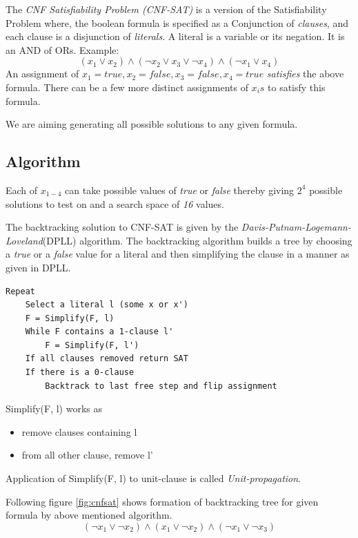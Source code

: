 \documentclass[a4paper]{article}
\begin{document}
The \emph{CNF Satisfiability Problem (CNF-SAT)} is a version of the Satisfiability Problem where, the boolean formula is specified as a Conjunction of \emph{clauses}, and each clause is a disjunction of \emph{literals}. A literal is a variable or its negation. It is an AND of ORs. Example: $$(x_{1} \lor x_{2})\land(\neg x_{2} \lor x_{3} \lor \neg x_{4})\land(\neg x_{1} \lor x_{4})$$
An assignment of $x_{1} = true, x_{2} = false, x_{3} = false, x_{4} = true$ \emph{satisfies} the above formula. There can be a few more distinct assignments of $x_{i}s$ to satisfy this formula.

We are aiming generating all possible solutions to any given formula.
\subsection*{Algorithm}
Each of $x_{1-4}$ can take possible values of \emph{true} or \emph{false} thereby giving $2^{4}$ possible solutions to test on and a search space of \emph{16} values.

The backtracking solution to CNF-SAT is given by the \emph{Davis-Putnam-Logemann-Loveland}(DPLL) algorithm\cite{dpll}. The backtracking algorithm builds a tree by choosing a \emph{true} or a \emph{false} value for a literal and then simplifying the clause in a manner as given in DPLL.
\begin{lstlisting}
Repeat
	Select a literal l (some x or x')
	F = Simplify(F, l)
	While F contains a 1-clause l'
		F = Simplify(F, l')
	If all clauses removed return SAT
	If there is a 0-clause
		Backtrack to last free step and flip assignment
\end{lstlisting}

Simplify(F, l) works as
\begin{itemize}
\item{} remove clauses containing l
\item{} from all other clause, remove l' 
\end{itemize}

Application of Simplify(F, l) to unit-clause is called \emph{Unit-propagation}.

Following figure \ref{fig:cnfsat} shows formation of backtracking tree for given formula by above mentioned algorithm.
$$(\neg x_{1} \lor \neg x_{2})\land(x_{1} \lor \neg x_{2})\land(\neg x_{1} \lor \neg x_{3})$$
\end{document}
